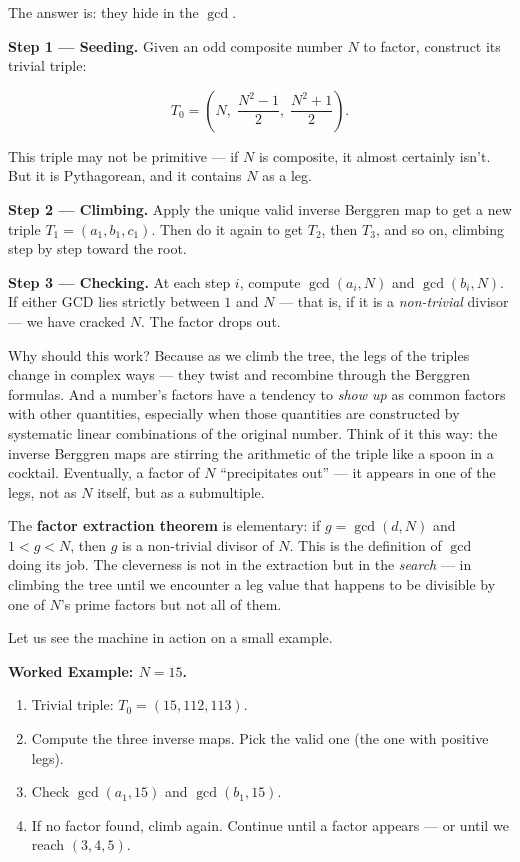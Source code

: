 The answer is: they hide in the \(\gcd\).

\textbf{Step 1 --- Seeding.} Given an odd composite number \(N\) to factor, construct its trivial triple:

\[T_0 = \left(N,\;\frac{N^2 - 1}{2},\;\frac{N^2 + 1}{2}\right).\]

This triple may not be primitive --- if \(N\) is composite, it almost certainly isn't. But it is Pythagorean, and it contains \(N\) as a leg.

\textbf{Step 2 --- Climbing.} Apply the unique valid inverse Berggren map to get a new triple \(T_1 = (a_1, b_1, c_1)\). Then do it again to get \(T_2\), then \(T_3\), and so on, climbing step by step toward the root.

\textbf{Step 3 --- Checking.} At each step \(i\), compute \(\gcd(a_i, N)\) and \(\gcd(b_i, N)\). If either GCD lies strictly between \(1\) and \(N\) --- that is, if it is a \emph{non-trivial} divisor --- we have cracked \(N\). The factor drops out.

Why should this work? Because as we climb the tree, the legs of the triples change in complex ways --- they twist and recombine through the Berggren formulas. And a number's factors have a tendency to \emph{show up} as common factors with other quantities, especially when those quantities are constructed by systematic linear combinations of the original number. Think of it this way: the inverse Berggren maps are stirring the arithmetic of the triple like a spoon in a cocktail. Eventually, a factor of \(N\) ``precipitates out'' --- it appears in one of the legs, not as \(N\) itself, but as a submultiple.

The \textbf{factor extraction theorem} is elementary: if \(g = \gcd(d, N)\) and \(1 < g < N\), then \(g\) is a non-trivial divisor of \(N\). This is the definition of \(\gcd\) doing its job. The cleverness is not in the extraction but in the \emph{search} --- in climbing the tree until we encounter a leg value that happens to be divisible by one of \(N\)'s prime factors but not all of them.

Let us see the machine in action on a small example.

\textbf{Worked Example: \(N = 15\).}

\begin{enumerate}
\def\labelenumi{\arabic{enumi}.}
\tightlist
\item
  Trivial triple: \(T_0 = (15, 112, 113)\).
\item
  Compute the three inverse maps. Pick the valid one (the one with positive legs).
\item
  Check \(\gcd(a_1, 15)\) and \(\gcd(b_1, 15)\).
\item
  If no factor found, climb again. Continue until a factor appears --- or until we reach \((3, 4, 5)\).
\end{enumerate}


